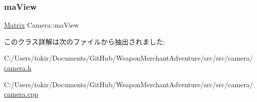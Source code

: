 \mbox{\label{class_camera_ac762f84210cdf6a30b0b311c943bd236}} 
\subsubsection{\texorpdfstring{ma\+View}{maView}}
{\footnotesize\ttfamily \mbox{\hyperlink{common_8h_ac6b2f2a47a728f9de5b5700d5aea93de}{Matrix}} Camera\+::ma\+View}



このクラス詳解は次のファイルから抽出されました\+:\begin{DoxyCompactItemize}
\item 
C\+:/\+Users/tokir/\+Documents/\+Git\+Hub/\+Weapon\+Merchant\+Adventure/src/src/camera/\mbox{\hyperlink{camera_8h}{camera.\+h}}\item 
C\+:/\+Users/tokir/\+Documents/\+Git\+Hub/\+Weapon\+Merchant\+Adventure/src/src/camera/\mbox{\hyperlink{camera_8cpp}{camera.\+cpp}}\end{DoxyCompactItemize}
